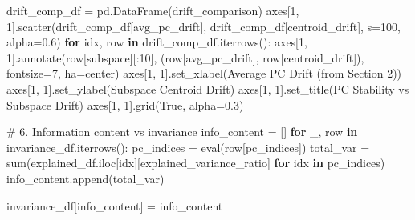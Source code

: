 \documentclass[
  letterpaper,
  DIV=11,
  numbers=noendperiod]{scrartcl}
\newenvironment{Shaded}{\begin{snugshade}}{\end{snugshade}}
\newcommand{\BuiltInTok}[1]{\textcolor[rgb]{0.00,0.23,0.31}{#1}}
\newcommand{\CommentTok}[1]{\textcolor[rgb]{0.37,0.37,0.37}{#1}}
\newcommand{\ControlFlowTok}[1]{\textcolor[rgb]{0.00,0.23,0.31}{\textbf{#1}}}
\newcommand{\DecValTok}[1]{\textcolor[rgb]{0.68,0.00,0.00}{#1}}
\newcommand{\FloatTok}[1]{\textcolor[rgb]{0.68,0.00,0.00}{#1}}
\newcommand{\KeywordTok}[1]{\textcolor[rgb]{0.00,0.23,0.31}{\textbf{#1}}}
\newcommand{\NormalTok}[1]{\textcolor[rgb]{0.00,0.23,0.31}{#1}}
\newcommand{\OperatorTok}[1]{\textcolor[rgb]{0.37,0.37,0.37}{#1}}
\newcommand{\StringTok}[1]{\textcolor[rgb]{0.13,0.47,0.30}{#1}}
\newcommand{\VariableTok}[1]{\textcolor[rgb]{0.07,0.07,0.07}{#1}}
\renewenvironment{Shaded}{%
  \begin{tcolorbox}[%
    enhanced,%
    colback=codebg,%
    colframe=codebg,%
    borderline west={3pt}{0pt}{sectionblue},%
    fontupper=\small\ttfamily,%
    boxrule=0pt,%
    arc=0pt,%
    boxsep=5pt,%
    left=2mm,%
    right=2mm,%
    top=2mm,%
    bottom=2mm%
  ]%
}{%
  \end{tcolorbox}%
}
\begin{document}
\begin{Shaded}
\begin{Highlighting}[]
\NormalTok{drift\_comp\_df }\OperatorTok{=}\NormalTok{ pd.DataFrame(drift\_comparison)}
\NormalTok{axes[}\DecValTok{1}\NormalTok{, }\DecValTok{1}\NormalTok{].scatter(drift\_comp\_df[}\StringTok{\textquotesingle{}avg\_pc\_drift\textquotesingle{}}\NormalTok{], drift\_comp\_df[}\StringTok{\textquotesingle{}centroid\_drift\textquotesingle{}}\NormalTok{], }
\NormalTok{                  s}\OperatorTok{=}\DecValTok{100}\NormalTok{, alpha}\OperatorTok{=}\FloatTok{0.6}\NormalTok{)}
\ControlFlowTok{for}\NormalTok{ idx, row }\KeywordTok{in}\NormalTok{ drift\_comp\_df.iterrows():}
\NormalTok{    axes[}\DecValTok{1}\NormalTok{, }\DecValTok{1}\NormalTok{].annotate(row[}\StringTok{\textquotesingle{}subspace\textquotesingle{}}\NormalTok{][:}\DecValTok{10}\NormalTok{], }
\NormalTok{                       (row[}\StringTok{\textquotesingle{}avg\_pc\_drift\textquotesingle{}}\NormalTok{], row[}\StringTok{\textquotesingle{}centroid\_drift\textquotesingle{}}\NormalTok{]),}
\NormalTok{                       fontsize}\OperatorTok{=}\DecValTok{7}\NormalTok{, ha}\OperatorTok{=}\StringTok{\textquotesingle{}center\textquotesingle{}}\NormalTok{)}
\NormalTok{axes[}\DecValTok{1}\NormalTok{, }\DecValTok{1}\NormalTok{].set\_xlabel(}\StringTok{\textquotesingle{}Average PC Drift (from Section 2)\textquotesingle{}}\NormalTok{)}
\NormalTok{axes[}\DecValTok{1}\NormalTok{, }\DecValTok{1}\NormalTok{].set\_ylabel(}\StringTok{\textquotesingle{}Subspace Centroid Drift\textquotesingle{}}\NormalTok{)}
\NormalTok{axes[}\DecValTok{1}\NormalTok{, }\DecValTok{1}\NormalTok{].set\_title(}\StringTok{\textquotesingle{}PC Stability vs Subspace Drift\textquotesingle{}}\NormalTok{)}
\NormalTok{axes[}\DecValTok{1}\NormalTok{, }\DecValTok{1}\NormalTok{].grid(}\VariableTok{True}\NormalTok{, alpha}\OperatorTok{=}\FloatTok{0.3}\NormalTok{)}

\CommentTok{\# 6. Information content vs invariance}
\NormalTok{info\_content }\OperatorTok{=}\NormalTok{ []}
\ControlFlowTok{for}\NormalTok{ \_, row }\KeywordTok{in}\NormalTok{ invariance\_df.iterrows():}
\NormalTok{    pc\_indices }\OperatorTok{=} \BuiltInTok{eval}\NormalTok{(row[}\StringTok{\textquotesingle{}pc\_indices\textquotesingle{}}\NormalTok{])}
\NormalTok{    total\_var }\OperatorTok{=} \BuiltInTok{sum}\NormalTok{(explained\_df.iloc[idx][}\StringTok{\textquotesingle{}explained\_variance\_ratio\textquotesingle{}}\NormalTok{] }\ControlFlowTok{for}\NormalTok{ idx }\KeywordTok{in}\NormalTok{ pc\_indices)}
\NormalTok{    info\_content.append(total\_var)}

\NormalTok{invariance\_df[}\StringTok{\textquotesingle{}info\_content\textquotesingle{}}\NormalTok{] }\OperatorTok{=}\NormalTok{ info\_content}


\end{Highlighting}
\end{Shaded}
\end{document}
